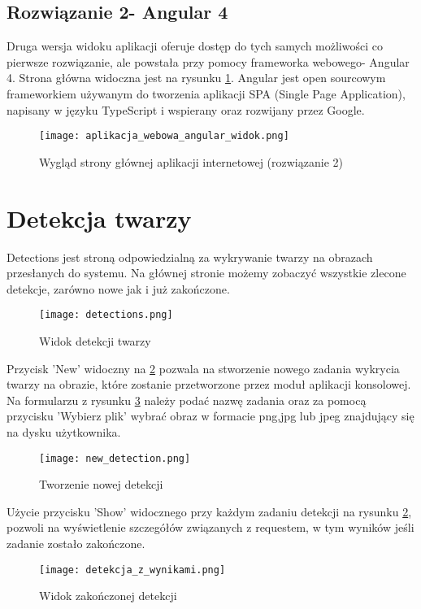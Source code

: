 \subsection{Rozwiązanie 2- Angular 4}
Druga wersja widoku aplikacji oferuje dostęp do tych samych możliwości co pierwsze rozwiązanie, ale powstała przy pomocy frameworka webowego- Angular 4. Strona główna widoczna jest na rysunku \ref{fig:strona_glowna_angular}. Angular jest open sourcowym frameworkiem używanym do tworzenia aplikacji SPA (Single Page Application), napisany w języku TypeScript i wspierany oraz rozwijany przez Google.
\begin{figure}[H]
	\centering
	\texttt{[image: aplikacja\_webowa\_angular\_widok.png]}
	\caption{Wygląd strony głównej aplikacji internetowej (rozwiązanie 2)}
	\label{fig:strona_glowna_angular}
\end{figure}

\section{Detekcja twarzy}
Detections jest stroną odpowiedzialną za wykrywanie twarzy na obrazach przesłanych do systemu. Na głównej stronie możemy zobaczyć wszystkie zlecone detekcje, zarówno nowe jak i już zakończone.
\begin{figure}[H]
	\centering
	\texttt{[image: detections.png]}
	\caption{Widok detekcji twarzy}
	\label{fig:detections}
\end{figure}
Przycisk 'New' widoczny na \ref{fig:detections} pozwala na stworzenie nowego zadania wykrycia twarzy na obrazie, które zostanie przetworzone przez moduł aplikacji konsolowej. Na formularzu z rysunku \ref{fig:new_detection} należy podać nazwę zadania oraz za pomocą przycisku 'Wybierz plik' wybrać obraz w formacie png,jpg lub jpeg znajdujący się na dysku użytkownika.
\begin{figure}[H]
	\centering
	\texttt{[image: new\_detection.png]}
	\caption{Tworzenie nowej detekcji}
	\label{fig:new_detection}
\end{figure}
Użycie przycisku 'Show' widocznego przy każdym zadaniu detekcji na rysunku \ref{fig:detections}, pozwoli na wyświetlenie szczegółów związanych z requestem, w tym wyników jeśli zadanie zostało zakończone.
\begin{figure}[H]
	\centering
	\texttt{[image: detekcja\_z\_wynikami.png]}
	\caption{Widok zakończonej detekcji}
	\label{fig:detekcja_zakonczona}
\end{figure}

